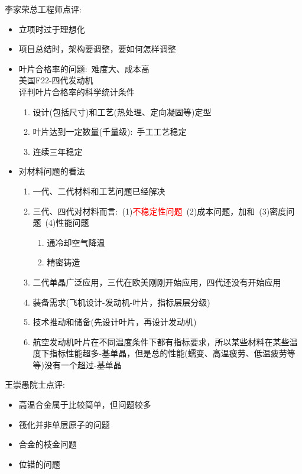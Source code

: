 \documentclass[10pt,a4paper]{article}
\begin{document}
李家荣总工程师点评:~
\begin{itemize}
	\item 立项时过于理想化
	\item 项目总结时，架构要调整，要如何怎样调整
	\item 叶片合格率的问题:~难度大、成本高\\
		美国\textrm{F22}-四代发动机\\
		评判叶片合格率的科学统计条件
		\begin{enumerate}
			\item 设计(包括尺寸)和工艺(热处理、定向凝固等)定型
			\item 叶片达到一定数量(千量级):~手工工艺稳定
			\item 连续三年稳定
		\end{enumerate}
	\item 对材料问题的看法
		\begin{enumerate}
			\item 一代、二代材料和工艺问题已经解决
			\item 三代、四代对材料而言:~(1)\textcolor{red}{不稳定性问题}~(2)成本问题，加和~(3)密度问题~(4)性能问题\\
				\begin{enumerate}
					\item 通冷却空气降温
					\item 精密铸造
				\end{enumerate}
			\item 二代单晶广泛应用，三代在欧美刚刚开始应用，四代还没有开始应用
			\item 装备需求(飞机设计-发动机-叶片，指标层层分级)
			\item 技术推动和储备(先设计叶片，再设计发动机)
			\item 航空发动机叶片在不同温度条件下都有指标要求，所以某些材料在某些温度下指标性能超多-基单晶，但是总的性能(蠕变、高温疲劳、低温疲劳等等)没有一个超过-基单晶
		\end{enumerate}
\end{itemize}

王崇愚院士点评:~
\begin{itemize}
	\item 高温合金属于比较简单，但问题较多
	\item 筏化并非单层原子的问题
	\item 合金的枝金问题
	\item 位错的问题
\end{itemize}
\end{document}
